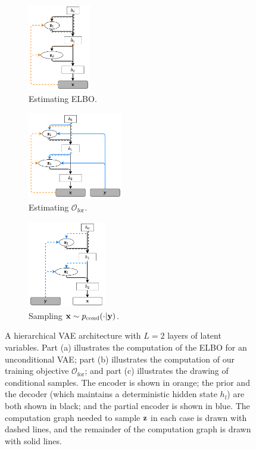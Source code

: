 \begin{figure}[t]
  \centering
  \begin{subfigure}[b]{.32\textwidth}
    \centering
    \includegraphics[height=3.8cm]{figs/cigcvae/arch_small-standard.pdf}
    \caption{Estimating ELBO.}
    \label{fig:hierarchical-vae}
  \end{subfigure}
  \begin{subfigure}[b]{.32\textwidth}
    \centering
    \includegraphics[height=3.8cm]{figs/cigcvae/arch_small-forward.pdf}
    \caption{Estimating $\mathcal{O}_\mathrm{for}$.}
    \label{fig:forward-arch}
  \end{subfigure}
  \begin{subfigure}[b]{.32\textwidth}
    \centering
    \includegraphics[height=3.8cm]{figs/cigcvae/arch_small-sampling.pdf}
    \caption{Sampling $\mathbf{x}{}\sim p_{\text{cond}}{}(\cdot|\mathbf{y}{})$.}
    \label{fig:reverse-arch}
  \end{subfigure}
  \vspace{-1mm}
  \caption{A hierarchical VAE architecture with $L=2$ layers of latent
    variables. Part (a) illustrates the computation of the ELBO for an
    unconditional VAE; part (b) illustrates the computation of our training
    objective $\mathcal{O}_\mathrm{for}$; and part (c) illustrates the drawing
    of conditional samples. The encoder is shown in orange; the prior and the
    decoder (which maintains a deterministic hidden state $h_{l}$) are both
    shown in black; and the partial encoder is shown in blue. The computation
    graph needed to sample $\mathbf{z}{}$ in each case is drawn with dashed lines, and
    the remainder of the computation graph is drawn with solid lines.}
  \label{fig:conditional-architectures}
  \vspace{-2mm}
\end{figure}

